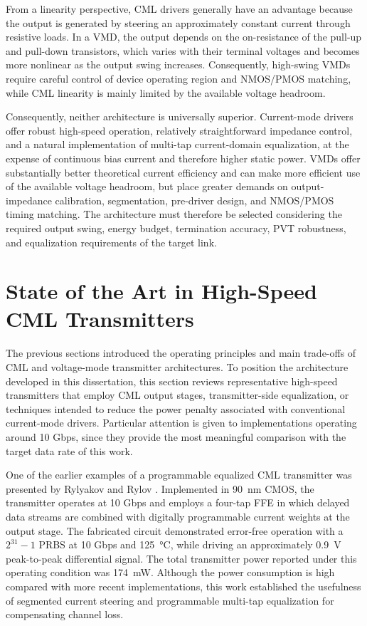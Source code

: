 From a linearity perspective, \ac{CML} drivers generally have an advantage because the output is generated by steering an approximately constant current through resistive loads. In a \ac{VMD}, the output depends on the on-resistance of the pull-up and pull-down transistors, which varies with their terminal voltages and becomes more nonlinear as the output swing increases. Consequently, high-swing \acsp{VMD} require careful control of device operating region and NMOS/PMOS matching, while \ac{CML} linearity is mainly limited by the available voltage headroom.

Consequently, neither architecture is universally superior. Current-mode drivers offer robust high-speed operation, relatively straightforward impedance control, and a natural implementation of multi-tap current-domain equalization, at the expense of continuous bias current and therefore higher static power. \acsp{VMD} offer substantially better theoretical current efficiency and can make more efficient use of the available voltage headroom, but place greater demands on output-impedance calibration, segmentation, pre-driver design, and NMOS/PMOS timing matching. The architecture must therefore be selected considering the required output swing, energy budget, termination accuracy, \ac{PVT} robustness, and equalization requirements of the target link.

\section{State of the Art in High-Speed \acs*{CML} Transmitters}
\label{sec:state_of_art}

The previous sections introduced the operating principles and main trade-offs of \ac{CML} and voltage-mode transmitter architectures. To position the architecture developed in this dissertation, this section reviews representative high-speed transmitters that employ \ac{CML} output stages, transmitter-side equalization, or techniques intended to reduce the power penalty associated with conventional current-mode drivers. Particular attention is given to implementations operating around 10 Gbps, since they provide the most meaningful comparison with the target data rate of this work.

One of the earlier examples of a programmable equalized \ac{CML} transmitter was presented by Rylyakov and Rylov \cite{rylyakov2005}. Implemented in \SI{90}{\nano\meter} \ac{CMOS}, the transmitter operates at 10 Gbps and employs a four-tap \ac{FFE} in which delayed data streams are combined with digitally programmable current weights at the output stage. The fabricated circuit demonstrated error-free operation with a $2^{31}-1$ \ac{PRBS} at 10 Gbps and \SI{125}{\celsius}, while driving an approximately \SI{0.9}{\volt} peak-to-peak differential signal. The total transmitter power reported under this operating condition was \SI{174}{\milli\watt}. Although the power consumption is high compared with more recent implementations, this work established the usefulness of segmented current steering and programmable multi-tap equalization for compensating channel loss.

